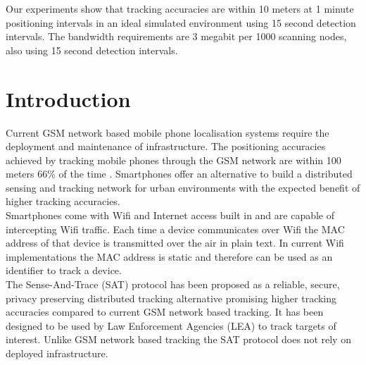 \documentclass[10pt,titlepage]{article}
\begin{document}
Our experiments show that tracking accuracies are within 10 meters at 1 minute positioning intervals in an ideal simulated environment using 15 second detection intervals. The bandwidth requirements are 3 megabit per 1000 scanning nodes, also using 15 second detection intervals. 

\newpage



\tableofcontents


\newpage
\section{Introduction}








%
Current GSM network based mobile phone localisation systems require the deployment and maintenance of infrastructure. The positioning accuracies achieved by tracking mobile phones through the GSM network are within 100 meters 66\% of the time \cite{CELLPHONETRACKING}. Smartphones offer an alternative to build a distributed sensing and tracking network for urban environments with the expected benefit of higher tracking accuracies.\\

Smartphones come with Wifi and Internet access built in and are capable of intercepting Wifi traffic. Each time a device communicates over Wifi the MAC address of that device is transmitted over the air in plain text. In current Wifi implementations the MAC address is static and therefore can be used as an identifier to track a device.\\

The Sense-And-Trace (SAT) protocol \cite{SAT} has been proposed as a reliable, secure, privacy preserving distributed tracking alternative promising higher tracking accuracies compared to current GSM network based tracking. It has been designed to be used by Law Enforcement Agencies (LEA) to track targets of interest. Unlike GSM network based tracking the SAT protocol does not rely on deployed infrastructure.\\
\end{document}

